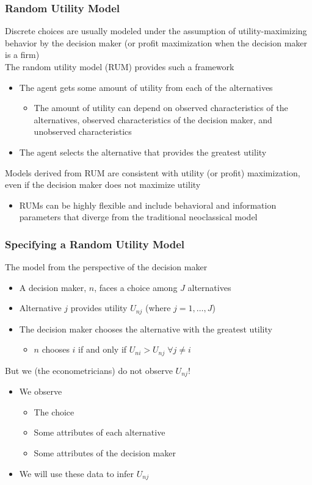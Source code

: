 \documentclass{beamer}
\begin{document}
\begin{frame}\frametitle{Random Utility Model}
    Discrete choices are usually modeled under the assumption of utility-maximizing behavior by the decision maker (or profit maximization when the decision maker is a firm) \\
    \vspace{2ex} 
    The random utility model (RUM) provides such a framework
    \begin{itemize}
    	\item The agent gets some amount of utility from each of the alternatives
    	\begin{itemize}
    		\item The amount of utility can depend on observed characteristics of the alternatives, observed characteristics of the decision maker, and unobserved characteristics
    	\end{itemize}
    	\item The agent selects the alternative that provides the greatest utility
    \end{itemize}
    \vspace{2ex}
    Models derived from RUM are consistent with utility (or profit) maximization, even if the decision maker does not maximize utility
    \begin{itemize}
    	\item RUMs can be highly flexible and include behavioral and information parameters that diverge from the traditional neoclassical model
    \end{itemize}
\end{frame}

\begin{frame}\frametitle{Specifying a Random Utility Model}
	The model from the perspective of the decision maker
	\begin{itemize}
		\item A decision maker, $n$, faces a choice among $J$ alternatives
    	\item Alternative $j$ provides utility $U_{nj}$ (where $j = 1, \ldots, J$)
    	\item The decision maker chooses the alternative with the greatest utility
    	\begin{itemize}
    		\item $n$ chooses $i$ if and only if $U_{ni} > U_{nj} \; \forall j \neq i$
    	\end{itemize}
   	\end{itemize}
   	\vspace{3ex}
   	But we (the econometricians) do not observe $U_{nj}$!
   	\begin{itemize}
   		\item We observe
   		\begin{itemize}
   			\item The choice
   			\item Some attributes of each alternative
   			\item Some attributes of the decision maker
   		\end{itemize}
   		\item We will use these data to infer $U_{nj}$
   	\end{itemize}
\end{frame}
\end{document}
